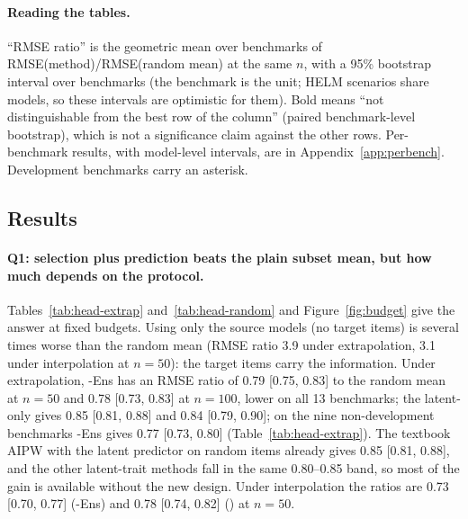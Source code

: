 \paragraph{Reading the tables.}
``RMSE ratio'' is the geometric mean over benchmarks of RMSE(method)/RMSE(random mean) at the same $n$, with a 95\% bootstrap interval over benchmarks (the benchmark is the unit; HELM scenarios share models, so these intervals are optimistic for them). Bold means ``not distinguishable from the best row of the column'' (paired benchmark-level bootstrap), which is not a significance claim against the other rows. Per-benchmark results, with model-level intervals, are in Appendix~\ref{app:perbench}. Development benchmarks carry an asterisk.

\subsection{Results}
\label{sec:results}

\begin{table}[t]
\caption{Cross-benchmark summary, extrapolation (top 20\% of models are targets), $n=50$ items. Ratios of RMSE to the random-subset mean (1 = no gain, lower is better; $\tau_b$ = Kendall rank correlation with the true target scores, mean over benchmarks). \textit{Sources only} uses no target items.}
\label{tab:head-extrap}
\centering\scriptsize

\end{table}

\begin{table}[t]
\caption{As Table~\ref{tab:head-extrap}, interpolation (20\% random models are targets), $n=50$.}
\label{tab:head-random}
\centering\scriptsize

\end{table}

\paragraph{Q1: selection plus prediction beats the plain subset mean, but how much depends on the protocol.}
Tables~\ref{tab:head-extrap} and~\ref{tab:head-random} and Figure~\ref{fig:budget} give the answer at fixed budgets. Using only the source models (no target items) is several times worse than the random mean (RMSE ratio 3.9 under extrapolation, 3.1 under interpolation at $n=50$): the target items carry the information. Under extrapolation, \mass{}-Ens has an RMSE ratio of 0.79 [0.75, 0.83] to the random mean at $n=50$ and 0.78 [0.73, 0.83] at $n=100$, lower on all 13 benchmarks; the latent-only \mass{} gives 0.85 [0.81, 0.88] and 0.84 [0.79, 0.90]; on the nine non-development benchmarks \mass{}-Ens gives 0.77 [0.73, 0.80] (Table~\ref{tab:head-extrap}). The textbook AIPW with the latent predictor on random items already gives 0.85 [0.81, 0.88], and the other latent-trait methods fall in the same 0.80--0.85 band, so most of the gain is available without the new design.
Under interpolation the ratios are 0.73 [0.70, 0.77] (\mass{}-Ens) and 0.78 [0.74, 0.82] (\mass{}) at $n=50$.

